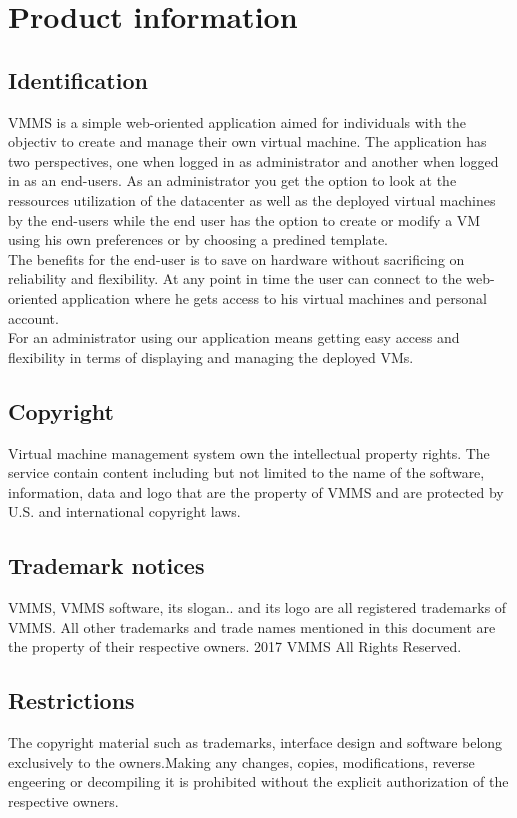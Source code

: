 \chapter{Product information}
\vspace{-6em}


\section{Identification}
VMMS is a simple web-oriented application aimed for individuals with the
objectiv to create and manage their own virtual machine. The application    
has two perspectives, one when logged in as administrator and another when
logged in as an end-users. As an administrator you get the option to look at
the ressources utilization of the datacenter as well as the deployed virtual
machines by the end-users while the end user has the option to create or modify 
a VM using his own preferences or by choosing a predined template.\\The benefits
for the end-user is to save on hardware without sacrificing on reliability and 
flexibility. At any point in time the user can connect to the web-oriented
application where he gets access to his virtual machines and personal
account.\\For an administrator using our application means getting easy access
and flexibility in terms of displaying and managing the deployed VMs.

\section{Copyright}

Virtual machine management system own the intellectual property rights. The
service contain content including  but not limited to the name of the software,
information, data and logo that are the property of VMMS and are protected by
U.S. and international copyright laws.

\section{Trademark notices}

VMMS, VMMS software, its slogan.. and its logo are all registered trademarks of
VMMS. All other trademarks and trade names mentioned in this document are the
property of their respective owners. 2017 VMMS All Rights Reserved.

\section{Restrictions}
The copyright material such as trademarks, interface design and software belong
exclusively to the owners.Making any changes, copies, modifications, reverse
engeering or decompiling it is prohibited without the explicit authorization of 
the respective owners.

